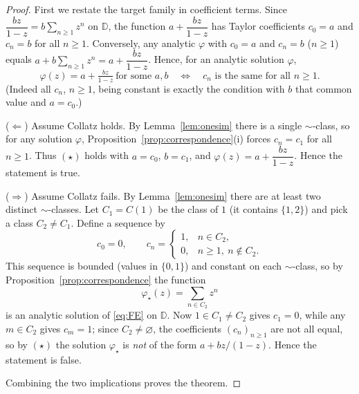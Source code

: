 \documentclass{amsart}
\theoremstyle{remark}
\begin{document}
\begin{proof}
First we restate the target family in coefficient terms. Since
$\dfrac{bz}{1-z}=b\sum_{n\ge1}z^n$ on $\mathbb{D}$, the function $a+\dfrac{bz}{1-z}$ has Taylor
coefficients $c_0=a$ and $c_n=b$ for all $n\ge1$. Conversely, any analytic $\varphi$ with
$c_0=a$ and $c_n=b$ ($n\ge1$) equals $a+b\sum_{n\ge1}z^n=a+\dfrac{bz}{1-z}$. Hence, for an analytic
solution $\varphi$,
\begin{equation}\label{eq:star}
\varphi(z)=a+\tfrac{bz}{1-z}\ \text{for some }a,b
\quad\Longleftrightarrow\quad
c_n \text{ is the same for all } n\ge1.\tag{$\star$}
\end{equation}
(Indeed all $c_n$, $n\ge1$, being constant is exactly the condition with $b$ that common value and
$a=c_0$.)

\smallskip
($\Leftarrow$) Assume Collatz holds. By Lemma~\ref{lem:onesim} there is a single $\sim$-class, so
for any solution $\varphi$, Proposition~\ref{prop:correspondence}(i) forces $c_n=c_1$ for all
$n\ge1$. Thus $(\star)$ holds with $a=c_0$, $b=c_1$, and $\varphi(z)=a+\dfrac{bz}{1-z}$. Hence the
statement is true.

\smallskip
($\Rightarrow$) Assume Collatz fails. By Lemma~\ref{lem:onesim} there are at least two distinct
$\sim$-classes. Let $C_1=C(1)$ be the class of $1$ (it contains $\{1,2\}$) and pick a class
$C_2\ne C_1$. Define a sequence by
\[
c_0=0,\qquad c_n=\begin{cases}1,& n\in C_2,\\ 0,& n\ge1,\ n\notin C_2.\end{cases}
\]
This sequence is bounded (values in $\{0,1\}$) and constant on each $\sim$-class, so by
Proposition~\ref{prop:correspondence} the function
\[
\varphi_\star(z)=\sum_{n\in C_2} z^n
\]
is an analytic solution of \eqref{eq:FE} on $\mathbb{D}$. Now $1\in C_1\ne C_2$ gives $c_1=0$,
while any $m\in C_2$ gives $c_m=1$; since $C_2\ne\varnothing$, the coefficients $(c_n)_{n\ge1}$ are
not all equal, so by $(\star)$ the solution $\varphi_\star$ is \emph{not} of the form
$a+bz/(1-z)$. Hence the statement is false.

\smallskip
Combining the two implications proves the theorem.
\end{proof}
\end{document}
